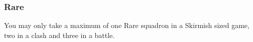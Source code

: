 \subsubsection{Rare}
You may only take a maximum of one Rare squadron in a Skirmish sized game, two in a clash and three in a battle.